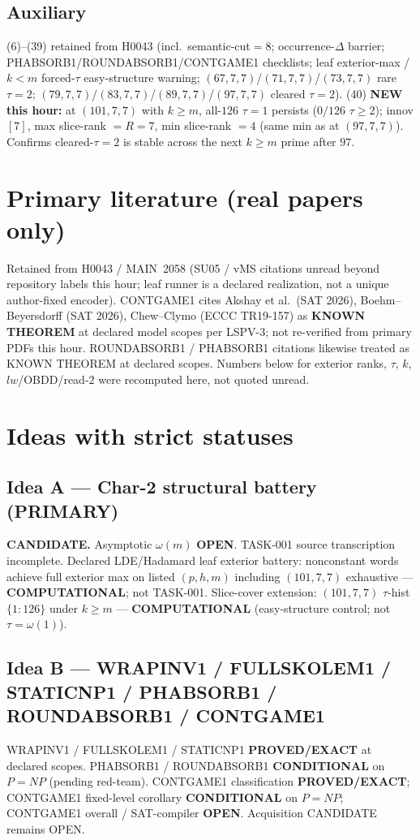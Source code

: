 \documentclass[11pt]{article}
\begin{document}
\subsection*{Auxiliary}
(6)--(39) retained from H0043 (incl.\ semantic-cut$=8$; occurrence-$\Delta$ barrier;
PHABSORB1/ROUNDABSORB1/CONTGAME1 checklists; leaf exterior-max / $k{<}m$ forced-$\tau$ easy-structure warning;
$(67,7,7)$/$(71,7,7)$/$(73,7,7)$ rare $\tau{=}2$; $(79,7,7)$/$(83,7,7)$/$(89,7,7)$/$(97,7,7)$ cleared $\tau{=}2$).
(40) \textbf{NEW this hour:} at $(101,7,7)$ with $k{\ge}m$, all-$126$ $\tau{=}1$ persists
($0/126$ $\tau{\ge}2$); innov $[7]$, max slice-rank $=R{=}7$, min slice-rank $=4$
(same min as at $(97,7,7)$). Confirms cleared-$\tau{=}2$
is stable across the next $k{\ge}m$ prime after $97$.

\section*{Primary literature (real papers only)}
Retained from H0043 / MAIN~2058 (SU05 / vMS citations unread beyond repository labels this hour;
leaf runner is a declared realization, not a unique author-fixed encoder).
CONTGAME1 cites Akshay et al.\ (SAT 2026), Boehm--Beyersdorff (SAT 2026),
Chew--Clymo (ECCC TR19-157) as \textbf{KNOWN THEOREM} at declared model scopes per LSPV-3;
not re-verified from primary PDFs this hour.
ROUNDABSORB1 / PHABSORB1 citations likewise treated as KNOWN THEOREM at declared scopes.
Numbers below for exterior ranks, $\tau$, $k$, $lw$/OBDD/read-$2$
were recomputed here, not quoted unread.

\section*{Ideas with strict statuses}
\subsection*{Idea A --- Char-2 structural battery (PRIMARY)}
\textbf{CANDIDATE.} Asymptotic $\omega(m)$ \textbf{OPEN}. TASK-001 source transcription incomplete.
Declared LDE/Hadamard leaf exterior battery: nonconstant words achieve full exterior max on
listed $(p,h,m)$ including $(101,7,7)$ exhaustive --- \textbf{COMPUTATIONAL}; not TASK-001.
Slice-cover extension: $(101,7,7)$ $\tau$-hist $\{1{:}126\}$ under $k{\ge}m$ ---
\textbf{COMPUTATIONAL} (easy-structure control; not $\tau=\omega(1)$).

\subsection*{Idea B --- WRAPINV1 / FULLSKOLEM1 / STATICNP1 / PHABSORB1 / ROUNDABSORB1 / CONTGAME1}
WRAPINV1 / FULLSKOLEM1 / STATICNP1 \textbf{PROVED/EXACT} at declared scopes.
PHABSORB1 / ROUNDABSORB1 \textbf{CONDITIONAL} on $P=NP$ (pending red-team).
CONTGAME1 classification \textbf{PROVED/EXACT}; CONTGAME1 fixed-level corollary
\textbf{CONDITIONAL} on $P=NP$; CONTGAME1 overall / SAT-compiler \textbf{OPEN}.
Acquisition CANDIDATE remains OPEN.
\end{document}
